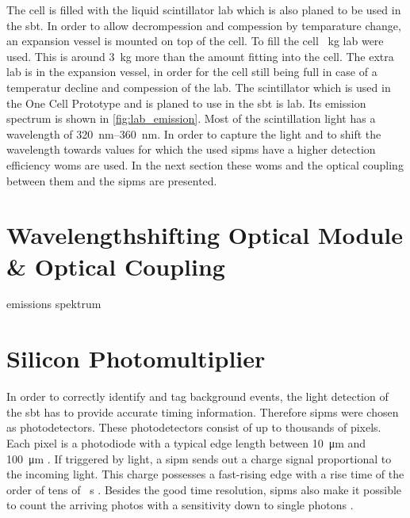 The cell is filled with the liquid scintillator \ac{lab} which is also planed to be used in the \ac{sbt}.
In order to allow decrompession and compession by temparature change, an expansion vessel is mounted on top of the cell.
To fill the cell \SI{}{\kilo\gram} \ac{lab} were used.
This is around \SI{3}{\kilo\gram} more than the amount fitting into the cell.
The extra \ac{lab} is in the expansion vessel, in order for the cell still being full in case of a temperatur decline and compession of the \ac{lab}.
The scintillator which is used in the One Cell Prototype and is planed to use in the \ac{sbt} is \ac{lab}.
Its emission spectrum is shown in \autoref{fig:lab_emission}.
Most of the scintillation light has a wavelength of \SIrange{320}{360}{\nano\meter}.
In order to capture the light and to shift the wavelength towards values for which the used \acp{sipm} have a higher detection efficiency \acp{wom} are used.
In the next section these \acp{wom} and the optical coupling between them and the \acp{sipm} are presented.



\section{Wavelengthshifting Optical Module \& Optical Coupling}

emissions spektrum


\section{Silicon Photomultiplier}
In order to correctly identify and tag background events, the light detection of the \ac{sbt} has to provide accurate timing information.
Therefore \acp{sipm} were chosen as photodetectors.
These photodetectors consist of up to thousands of pixels.
Each pixel is a photodiode with a typical edge length between \SI{10}{\micro\meter} and \SI{100}{\micro\meter} \cite{nucl}.
If triggered by light, a \ac{sipm} sends out a charge signal proportional to the incoming light.
This charge possesses a fast-rising edge with a rise time of the order of tens of \si{\piko\second} \cite{nucl}.
Besides the good time resolution, \acp{sipm} also make it possible to count the arriving photos with a sensitivity down to single photons \cite{HAMA_mppc}.


